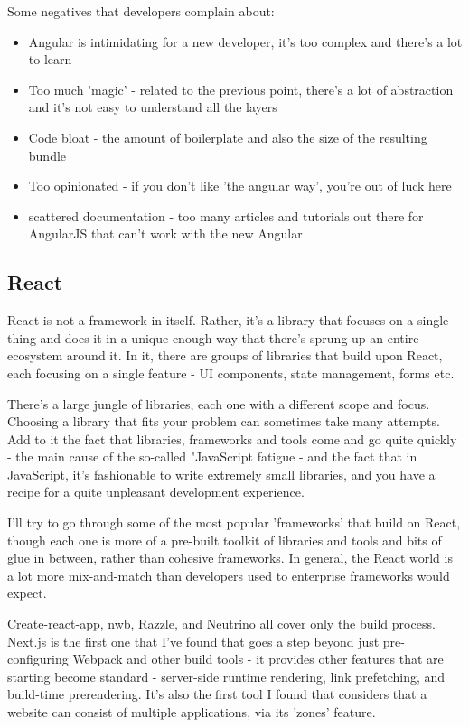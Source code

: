 \documentclass[english,odsaz]{fitthesis}
\begin{document}
Some negatives that developers complain about:
\begin{itemize}
\item Angular is intimidating for a new developer, it's too complex and there's a
lot to learn
\item Too much 'magic' - related to the previous point, there's a lot of abstraction
and it's not easy to understand all the layers
\item Code bloat - the amount of boilerplate and also the size of the resulting bundle
\item Too opinionated - if you don't like 'the angular way', you're out of luck here
\item scattered documentation - too many articles and tutorials out there for
AngularJS that can't work with the new Angular
\end{itemize}

\subsection{React}
\label{sec:org6677fa9}
React is not a framework in itself. Rather, it's a library that focuses on a
single thing and does it in a unique enough way that there's sprung up an entire
ecosystem around it. In it, there are groups of libraries that build upon React,
each focusing on a single feature - UI components, state management, forms etc.

There's a large jungle of libraries, each one with a different scope and
focus. Choosing a library that fits your problem can sometimes take many
attempts. Add to it the fact that libraries, frameworks and tools come and go
quite quickly - the main cause of the so-called "JavaScript fatigue - and the
fact that in JavaScript, it's fashionable to write extremely small libraries,
and you have a recipe for a quite unpleasant development experience.

I'll try to go through some of the most popular 'frameworks' that build on
React, though each one is more of a pre-built toolkit of libraries and tools
and bits of glue in between, rather than cohesive frameworks. In general, the
React world is a lot more mix-and-match than developers used to enterprise
frameworks would expect.

Create-react-app, nwb, Razzle, and Neutrino all cover only the build
process. Next.js is the first one that I've found that goes a step beyond just
pre-configuring Webpack and other build tools - it provides other features that
are starting become standard - server-side runtime rendering, link prefetching,
and build-time prerendering. It's also the first tool I found that considers
that a website can consist of multiple applications, via its 'zones' feature.
\end{document}

